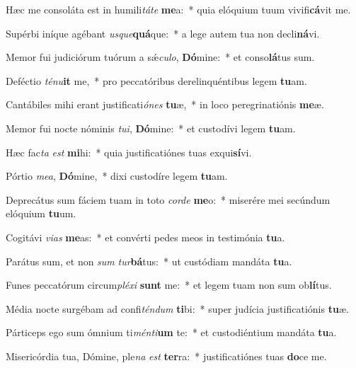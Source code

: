 \item Hæc me consoláta est in humili\textit{tá}\textit{te} \textbf{me}a:~* quia elóquium tuum vivifi\textbf{cá}vit me.
\item Supérbi iníque agébant \textit{us}\textit{que}\textbf{quá}que:~* a lege autem tua non decli\textbf{ná}vi.
\item Memor fui judiciórum tuórum a sǽ\textit{cu}\textit{lo}, \textbf{Dó}mine:~* et conso\textbf{lá}tus sum.
\item Deféctio \textit{té}\textit{nu}\textbf{it} me,~* pro peccatóribus derelinquéntibus legem \textbf{tu}am.
\item Cantábiles mihi erant justificati\textit{ó}\textit{nes} \textbf{tu}æ,~* in loco peregrinatiónis \textbf{me}æ.
\item Memor fui nocte nóminis \textit{tu}\textit{i}, \textbf{Dó}mine:~* et custodívi legem \textbf{tu}am.
\item Hæc fac\textit{ta} \textit{est} \textbf{mi}hi:~* quia justificatiónes tuas exqui\textbf{sí}vi.
\item Pórtio \textit{me}\textit{a}, \textbf{Dó}mine,~* dixi custodíre legem \textbf{tu}am.
\item Deprecátus sum fáciem tuam in toto \textit{cor}\textit{de} \textbf{me}o:~* miserére mei secúndum elóquium \textbf{tu}um.
\item Cogitávi \textit{vi}\textit{as} \textbf{me}as:~* et convérti pedes meos in testimónia \textbf{tu}a.
\item Parátus sum, et non \textit{sum} \textit{tur}\textbf{bá}tus:~* ut custódiam mandáta \textbf{tu}a.
\item Funes peccatórum circum\textit{plé}\textit{xi} \textbf{sunt} me:~* et legem tuam non sum ob\textbf{lí}tus.
\item Média nocte surgébam ad confi\textit{tén}\textit{dum} \textbf{ti}bi:~* super judícia justificatiónis \textbf{tu}æ.
\item Párticeps ego sum ómnium ti\textit{mén}\textit{ti}\textbf{um} te:~* et custodiéntium mandáta \textbf{tu}a.
\item Misericórdia tua, Dómine, ple\textit{na} \textit{est} \textbf{ter}ra:~* justificatiónes tuas \textbf{do}ce me.
